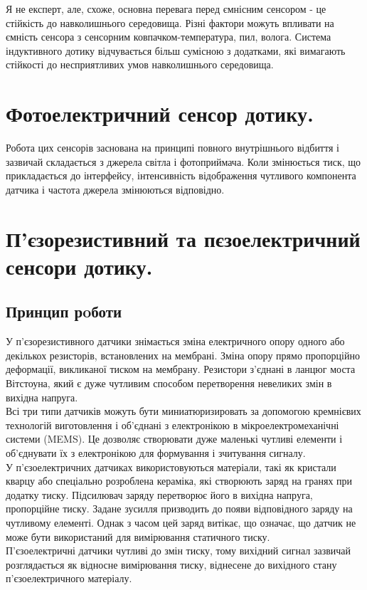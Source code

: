 \documentclass[a4paper,fontsize=12]{report}
\begin{document}
  Я не експерт, але, схоже, основна перевага перед ємнісним сенсором - це стійкість до навколишнього середовища. Різні фактори можуть впливати на ємність сенсора з сенсорним ковпачком-температура, пил, волога. Система індуктивного дотику відчувається більш сумісною з додатками, які вимагають стійкості до несприятливих умов навколишнього середовища.
\chapter{Фотоелектричний сенсор дотику.}
    Робота цих сенсорів заснована на принципі повного внутрішнього відбиття і зазвичай складається з джерела світла і 
    фотоприймача. Коли змінюється тиск, що прикладається до інтерфейсу, інтенсивність відображення чутливого компонента датчика і частота джерела змінюються відповідно.

\chapter{П'єзорезистивний та пєзоелектричний сенсори дотику.}
\section{Принцип рoботи}
  У п'єзорезистивного датчики знімається зміна електричного опору одного або декількох резисторів, встановлених на мембрані.
  Зміна опору прямо пропорційно деформації, викликаної тиском на мембрану. Резистори з'єднані в ланцюг моста Вітстоуна, який є дуже чутливим способом перетворення невеликих змін в вихідна напруга. \\

  Всі три типи датчиків можуть бути миниатюризировать за допомогою кремнієвих технологій виготовлення і об'єднані з електронікою в мікроелектромеханічні системи (MEMS). Це дозволяє створювати дуже маленькі чутливі елементи і об'єднувати їх з електронікою для формування і зчитування сигналу. \\

  У п'єзоелектричних датчиках використовуються матеріали, такі як кристали кварцу або спеціально розроблена кераміка, які створюють заряд на гранях при додатку тиску. Підсилювач заряду перетворює його в вихідна напруга, пропорційне тиску. Задане зусилля призводить до появи відповідного заряду на чутливому елементі. Однак з часом цей заряд витікає, що означає, що датчик не може бути використаний для вимірювання статичного тиску.\\

  П'єзоелектричні датчики чутливі до змін тиску, тому вихідний сигнал зазвичай розглядається як відносне вимірювання тиску, віднесене до вихідного стану п'єзоелектричного матеріалу.\\
\end{document}

